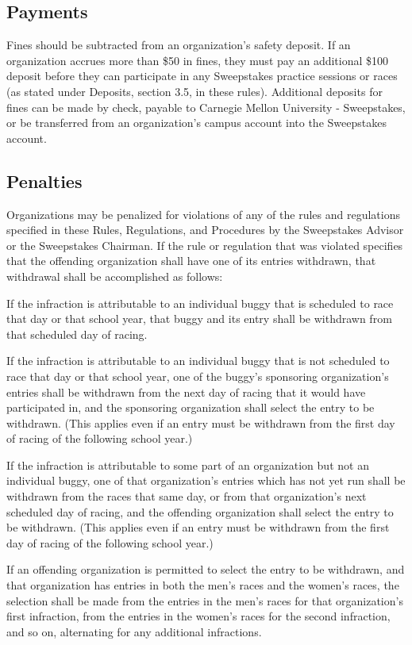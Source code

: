\subsection{Payments}

	Fines should be subtracted from an organization's safety deposit. If an
	organization accrues more than \$50 in fines, they must pay an additional \$100
	deposit before they can participate in any Sweepstakes practice sessions or
	races (as stated under Deposits, section 3.5, in these rules). Additional
	deposits for fines can be made by check, payable to Carnegie Mellon University
	- Sweepstakes, or be transferred from an organization's campus account into the
	Sweepstakes account.

\subsection{Penalties}

	Organizations may be penalized for violations of any of the rules and
	regulations specified in these Rules, Regulations, and Procedures by the
	Sweepstakes Advisor or the Sweepstakes Chairman. If the rule or regulation that
	was violated specifies that the offending organization shall have one of its
	entries withdrawn, that withdrawal shall be accomplished as follows:

	If the infraction is attributable to an individual buggy that is scheduled to
	race that day or that school year, that buggy and its entry shall be withdrawn
	from that scheduled day of racing.

	If the infraction is attributable to an individual buggy that is not scheduled
	to race that day or that school year, one of the buggy's sponsoring
	organization's entries shall be withdrawn from the next day of racing that it
	would have participated in, and the sponsoring organization shall select the
	entry to be withdrawn. (This applies even if an entry must be withdrawn from
	the first day of racing of the following school year.)

	If the infraction is attributable to some part of an organization but not an
	individual buggy, one of that organization's entries which has not yet run
	shall be withdrawn from the races that same day, or from that organization's
	next scheduled day of racing, and the offending organization shall select the
	entry to be withdrawn. (This applies even if an entry must be withdrawn from
	the first day of racing of the following school year.)

	If an offending organization is permitted to select the entry to be withdrawn,
	and that organization has entries in both the men's races and the women's
	races, the selection shall be made from the entries in the men's races for that
	organization's first infraction, from the entries in the women's races for the
	second infraction, and so on, alternating for any additional infractions.

